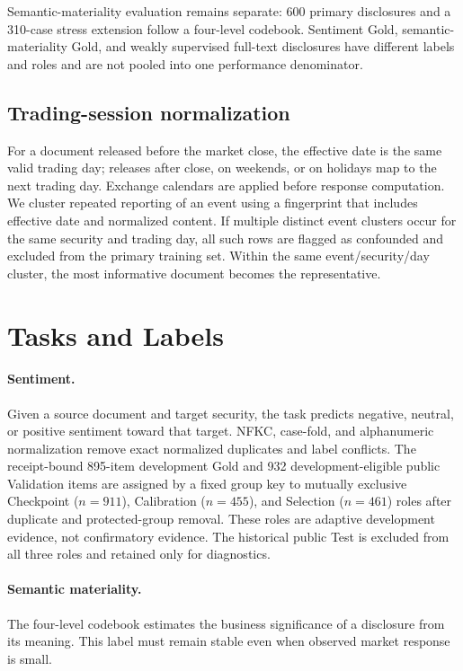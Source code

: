 \documentclass[11pt]{article}
\begin{document}
Semantic-materiality evaluation remains separate: 600 primary disclosures and a 310-case stress extension follow a four-level codebook. Sentiment Gold, semantic-materiality Gold, and weakly supervised full-text disclosures have different labels and roles and are not pooled into one performance denominator.

\subsection{Trading-session normalization}

For a document released before the market close, the effective date is the same valid trading day; releases after close, on weekends, or on holidays map to the next trading day. Exchange calendars are applied before response computation. We cluster repeated reporting of an event using a fingerprint that includes effective date and normalized content. If multiple distinct event clusters occur for the same security and trading day, all such rows are flagged as confounded and excluded from the primary training set. Within the same event/security/day cluster, the most informative document becomes the representative.

\section{Tasks and Labels}

\paragraph{Sentiment.}
Given a source document and target security, the task predicts negative, neutral, or positive sentiment toward that target. NFKC, case-fold, and alphanumeric normalization remove exact normalized duplicates and label conflicts. The receipt-bound 895-item development Gold and 932 development-eligible public Validation items are assigned by a fixed group key to mutually exclusive Checkpoint ($n=911$), Calibration ($n=455$), and Selection ($n=461$) roles after duplicate and protected-group removal. These roles are adaptive development evidence, not confirmatory evidence. The historical public Test is excluded from all three roles and retained only for diagnostics.

\paragraph{Semantic materiality.}
The four-level codebook estimates the business significance of a disclosure from its meaning. This label must remain stable even when observed market response is small.
\end{document}
